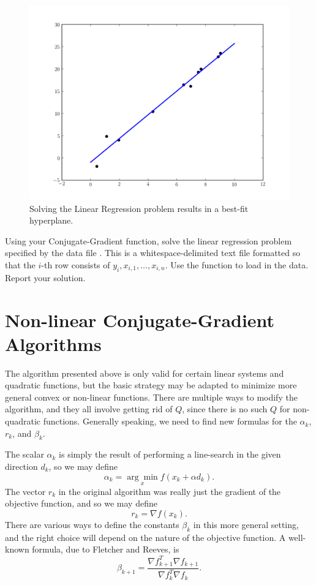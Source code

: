 \begin{figure}
\centering
\includegraphics[width=\textwidth]{linregression.pdf}
\caption{Solving the Linear Regression problem results in a best-fit hyperplane.}
\label{fig:linregression}
\end{figure}

\begin{problem}
Using your Conjugate-Gradient function, solve the linear regression problem specified by the data file
. This is a whitespace-delimited text file formatted so that the $i$-th row consists of
$y_i, x_{i,1}, \ldots, x_{i,n}$. Use the function  to load in the data. Report your solution.
\end{problem}

\section*{Non-linear Conjugate-Gradient Algorithms}
The algorithm presented above is only valid for certain linear systems and quadratic functions, but the basic strategy may be adapted
to minimize more general convex or non-linear functions. There are multiple ways to modify the algorithm, and they all involve getting
rid of $Q$, since there is no such $Q$ for non-quadratic functions. Generally speaking, we need to find new formulas for the $\alpha_k$,
$r_k$, and $\beta_k$.

The scalar $\alpha_k$ is simply the result of performing a line-search in the given direction $d_k$, so we may define
$$\alpha_k = \underset{x}{\arg\min}f(x_k + \alpha d_k).$$
The vector $r_k$ in the original algorithm was really just the gradient of the objective
function, and so we may define $$r_k = \nabla f(x_k).$$
There are various ways to define the constants $\beta_k$ in this more general setting, and the
right choice will depend on the nature of the objective function. A well-known formula, due to Fletcher and Reeves, is
$$\beta_{k+1} = \frac{\nabla f_{k+1}^T \nabla f_{k+1}}{\nabla f_{k}^T \nabla f_{k}}.$$


